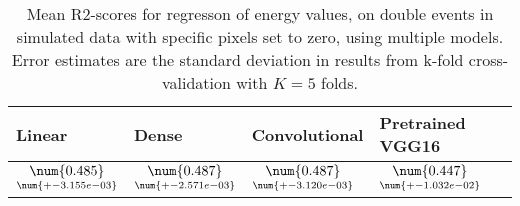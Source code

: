 \begin{table}
\centering
\caption{
Mean R2-scores for regresson of energy values, on double events in simulated data with specific pixels
set to zero, using multiple models. Error estimates are the standard deviation in results from k-fold 
cross-validation with $K=5$ folds.
}
\label{tab:regression-simulated-double-energy-pixelmod-r2}
\begin{tabular}{llll}
\toprule
                                             Linear &                                               Dense &                                       Convolutional &                                    Pretrained VGG16 \\
\midrule
 $\underset{\num{+- 3.155e-03 }  }{\num{ 0.485 } }$ &  $\underset{\num{+- 2.571e-03 }  }{\num{ 0.487 } }$ &  $\underset{\num{+- 3.120e-03 }  }{\num{ 0.487 } }$ &  $\underset{\num{+- 1.032e-02 }  }{\num{ 0.447 } }$ \\
\bottomrule
\end{tabular}
\end{table}
